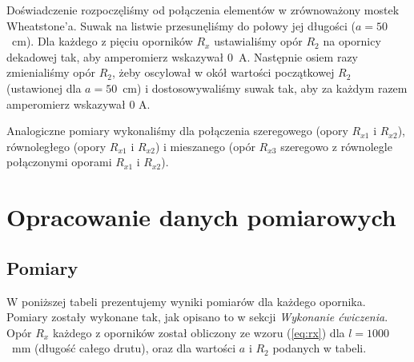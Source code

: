 \documentclass[12pt,a4paper]{article}
\numberwithin{equation}{section}
\begin{document}
Doświadczenie rozpoczęliśmy od połączenia elementów w zrównoważony mostek Wheatstone'a. Suwak na listwie przesunęliśmy do połowy jej długości ($a = 50$~cm). Dla każdego z pięciu oporników $R_x$ ustawialiśmy opór $R_2$ na opornicy dekadowej tak, aby amperomierz wskazywał $0$~A. Następnie osiem razy zmienialiśmy opór $R_2$, żeby oscylował w okół wartości początkowej $R_2$ (ustawionej dla $a = 50$~cm) i dostosowywaliśmy suwak tak, aby za każdym razem amperomierz wskazywał $0$ A.

Analogiczne pomiary wykonaliśmy dla połączenia szeregowego (opory $R_{x1}$ i $R_{x2}$), równoległego (opory $R_{x1}$ i $R_{x2}$) i mieszanego (opór $R_{x3}$ szeregowo z równolegle połączonymi oporami $R_{x1}$ i $R_{x2}$).

\pagebreak
\section{Opracowanie danych pomiarowych}
\subsection{Pomiary}
W poniższej tabeli prezentujemy wyniki pomiarów dla każdego opornika. Pomiary zostały wykonane tak, jak opisano to w sekcji \emph{Wykonanie ćwiczenia}. Opór $R_x$ każdego z oporników został obliczony ze wzoru (\ref{eq:rx}) dla $l = 1000$~mm (długość całego drutu), oraz dla wartości $a$ i $R_2$ podanych w tabeli.
\end{document}
